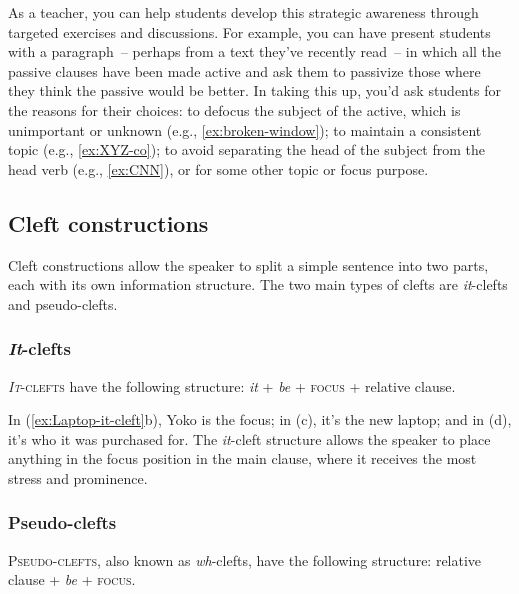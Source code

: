 As a teacher, you can help students develop this strategic awareness through targeted exercises and discussions. For example, you can have present students with a paragraph~-- perhaps from a text they've recently read~-- in which all the passive clauses have been made active and ask them to passivize those where they think the passive would be better. In taking this up, you'd ask students for the reasons for their choices: to defocus the subject of the active, which is unimportant or unknown (e.g., \ref{ex:broken-window}); to maintain a consistent topic (e.g., \ref{ex:XYZ-co}); to avoid separating the head of the subject from the head verb (e.g., \ref{ex:CNN}), or for some other topic or focus purpose.

\subsection{Cleft constructions} \label{sec:clefts}

Cleft constructions allow the speaker to split a simple sentence into two parts, each with its own information structure. The two main types of clefts are \textit{it}-clefts and pseudo-clefts.

\subsubsection*{\textit{It}-clefts}
\textsc{\textit{It}-clefts} have the following structure: \textit{it} + \textit{be} + \textsc{focus} + relative clause.

\ea \label{ex:Laptop-it-cleft}
    \z
\z

In (\ref{ex:Laptop-it-cleft}b), Yoko is the focus; in (c), it's the new laptop; and in (d), it's who it was purchased for. The \textit{it}-cleft structure allows the speaker to place anything in the focus position in the main clause, where it receives the most stress and prominence.

\subsubsection*{Pseudo-clefts}
\textsc{Pseudo-clefts}, also known as \textit{wh}-clefts, have the following structure: relative clause + \textit{be} + \textsc{focus}.

